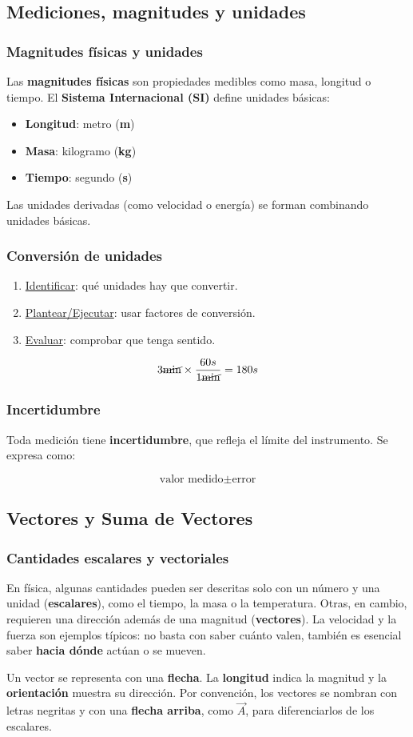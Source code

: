 \documentclass{article}
\newcommand{\newsubsection}[1]{
    \vspace{0.5cm}
    \color{sectionColor}
    \subsection{ #1}
    \color{black}
    \vspace{0.5cm}
}
\newcommand{\newtitle}[1]{
    \color{titleColor}
    \subsubsection{\textbf{#1}}
    \color{black}
}
\newcommand{\bl}[1]{\textbf{#1}}
\begin{document}

    \newsubsection{Mediciones, magnitudes y unidades}

    \newtitle{Magnitudes físicas y unidades}

    \par Las \bl{magnitudes físicas} son propiedades medibles como masa, longitud o tiempo. El \bl{Sistema Internacional (SI)} define unidades básicas:

    \begin{itemize}
        \item \bl{Longitud}: metro (\bl{m})
        \item \bl{Masa}: kilogramo (\bl{kg})
        \item \bl{Tiempo}: segundo (\bl{s})
    \end{itemize}

    \par Las unidades derivadas (como velocidad o energía) se forman combinando unidades básicas.

    \newtitle{Conversión de unidades}

    \begin{enumerate}
        \item \underline{Identificar}: qué unidades hay que convertir.
        \item \underline{Plantear/Ejecutar}: usar factores de conversión.
        \item \underline{Evaluar}: comprobar que tenga sentido.
    \end{enumerate}

    \[
        3\cancel{\text{min}} \times \frac{60s}{1\cancel{\text{min}}} = 180s
    \]

    \newtitle{Incertidumbre}

    \par Toda medición tiene \bl{incertidumbre}, que refleja el límite del instrumento. Se expresa como:

    \[
        \text{valor medido} \pm \text{error}
    \]

    \newsubsection{Vectores y Suma de Vectores}

    \newtitle{Cantidades escalares y vectoriales}

    \par En física, algunas cantidades pueden ser descritas solo con un número y una unidad (\bl{escalares}), como el tiempo, la masa o la temperatura. Otras, en cambio, requieren una dirección además de una magnitud (\bl{vectores}). La velocidad y la fuerza son ejemplos típicos: no basta con saber cuánto valen, también es esencial saber \bl{hacia dónde} actúan o se mueven.
    \par Un vector se representa con una \bl{flecha}. La \bl{longitud} indica la magnitud y la \bl{orientación} muestra su dirección. Por convención, los vectores se nombran con letras negritas y con una \bl{flecha arriba}, como \(\vec{A}\), para diferenciarlos de los escalares.
\end{document}
